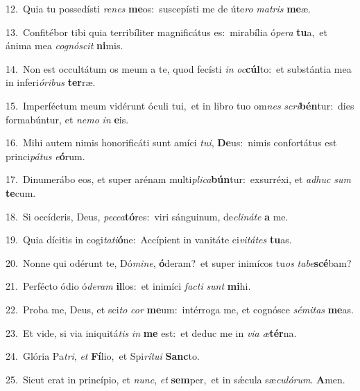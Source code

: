 {\numbfont\textcolor{\numbcolor}{12.}}~Quia tu possedísti \textit{re}\-\textit{nes} \textbf{me}\-os:~\star suscepísti me de úte\textit{ro} \textit{ma}\-\textit{tris} \textbf{me}\-æ.\par
{\numbfont\textcolor{\numbcolor}{13.}}~Confitébor tibi quia terribíliter magnificátus es:~\dagger mirabília ó\-\textit{pe}\-\textit{ra} \textbf{tu}\-a,~\star et ánima mea \textit{co}\-\textit{gnó}\textit{scit} \textbf{ni}\-mis.\par
{\numbfont\textcolor{\numbcolor}{14.}}~Non est occultátum os meum a te, quod fecísti \textit{in} \textit{oc}\-\textbf{cúl}to:~\star et substántia mea in inferi\-\textit{ó}\-\textit{ri}\textit{bus} \textbf{ter}\-ræ.\par
{\numbfont\textcolor{\numbcolor}{15.}}~Imperféctum meum vidérunt óculi tui,~\dagger et in libro tuo om\textit{nes} \textit{scri}\-\textbf{bén}tur:~\star dies formabúntur, et \textit{ne}\-\textit{mo} \textit{in} \textbf{e}\-is.\par
{\numbfont\textcolor{\numbcolor}{16.}}~Mihi autem nimis honorificáti sunt amíci \textit{tu}\-\textit{i}, \textbf{De}\-us:~\star nimis confortátus est princi\-\textit{pá}\-\textit{tus} \textit{e}\-\textbf{ó}rum.\par
{\numbfont\textcolor{\numbcolor}{17.}}~Dinumerábo eos, et super arénam multi\-\textit{pli}\-\textit{ca}\textbf{bún}tur:~\star exsurréxi, et \textit{ad}\-\textit{huc} \textit{sum} \textbf{te}\-cum.\par
{\numbfont\textcolor{\numbcolor}{18.}}~Si occíderis, Deus, \textit{pec}\-\textit{ca}\textbf{tó}res:~\star viri sánguinum, de\-\textit{cli}\-\textit{ná}\textit{te} \textbf{a} me.\par
{\numbfont\textcolor{\numbcolor}{19.}}~Quia dícitis in cogi\-\textit{ta}\-\textit{ti}\textbf{ó}ne:~\star Accípient in vanitáte ci\-\textit{vi}\-\textit{tá}\textit{tes} \textbf{tu}\-as.\par
{\numbfont\textcolor{\numbcolor}{20.}}~Nonne qui odérunt te, Dó\-\textit{mi}\-\textit{ne}, \textbf{ó}\-deram?~\star et super inimícos tu\textit{os} \textit{ta}\-\textit{be}\textbf{scé}bam?\par
{\numbfont\textcolor{\numbcolor}{21.}}~Perfécto ódio ó\-\textit{de}\-\textit{ram} \textbf{il}\-los:~\star et inimíci \textit{fac}\-\textit{ti} \textit{sunt} \textbf{mi}\-hi.\par
{\numbfont\textcolor{\numbcolor}{22.}}~Proba me, Deus, et sci\textit{to} \textit{cor} \textbf{me}\-um:~\star intérroga me, et cognósce \textit{sé}\-\textit{mi}\textit{tas} \textbf{me}\-as.\par
{\numbfont\textcolor{\numbcolor}{23.}}~Et vide, si via iniquitá\textit{tis} \textit{in} \textbf{me} est:~\star et deduc me in \textit{vi}\-\textit{a} \textit{æ}\-\textbf{tér}na.\par
{\numbfont\textcolor{\numbcolor}{24.}}~Glória Pa\-\textit{tri}\-, \textit{et} \textbf{Fí}\-lio,~\star et Spi\-\textit{rí}\-\textit{tu}\textit{i} \textbf{Sanc}\-to.\par
{\numbfont\textcolor{\numbcolor}{25.}}~Sicut erat in princípio, et \textit{nunc}\-, \textit{et} \textbf{sem}\-per,~\star et in sǽcula sæ\-\textit{cu}\-\textit{ló}\textit{rum}. \textbf{A}\-men.\par
